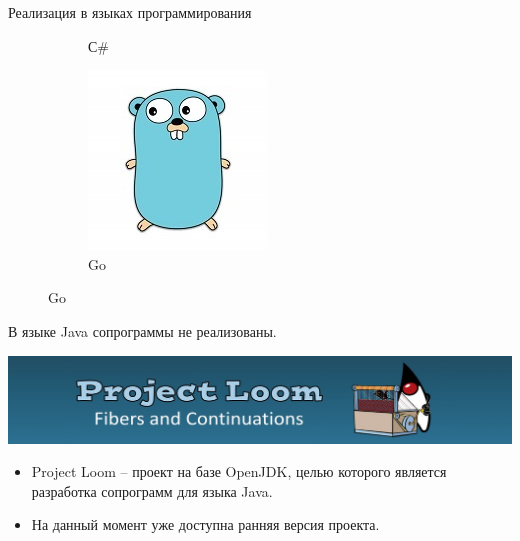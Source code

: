 \begin{frame}{Реализация в языках программирования}
\begin{figure}
\begin{subfigure}[b]{0.25\linewidth}
		\caption{С\#}
	\end{subfigure}
	\hfill
	\begin{subfigure}[b]{0.27\linewidth}
		\includegraphics[width=\linewidth]{images/go.jpg}
		\caption{Go}
	\end{subfigure}
	
	\end{figure}
	\par
	В языке Java сопрограммы не реализованы.
\end{frame}

\begin{frame}
	\includegraphics[scale=0.4]{images/loom.jpg}
	\begin{itemize}
		\item Project Loom – проект на базе OpenJDK, целью которого является разработка сопрограмм для языка Java. 
		\item На данный момент уже доступна ранняя версия проекта.
	\end{itemize}
\end{frame}


